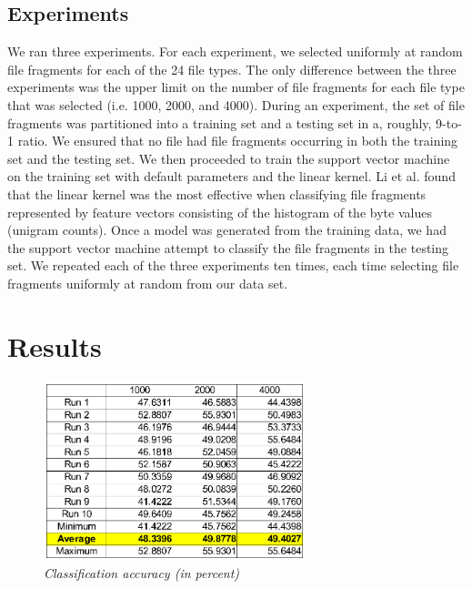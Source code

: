 \documentclass[5p]{elsarticle}
\begin{document}
\subsection{Experiments}
\label{Subsection:Experiments}
We ran three experiments. For each experiment, we selected uniformly at random file fragments for each of the 24 file types. The only difference between the three experiments was the upper limit on the number of file fragments for each file type that was selected (i.e. 1000, 2000, and 4000). During an experiment, the set of file fragments was partitioned into a training set and a testing set in a, roughly, 9-to-1 ratio. We ensured that no file had file fragments occurring in both the training set and the testing set. We then proceeded to train the support vector machine on the training set with default parameters and the linear kernel. Li et al. \cite{Li10} found that the linear kernel was the most effective when classifying file fragments represented by feature vectors consisting of the histogram of the byte values (unigram counts). Once a model was generated from the training data, we had the support vector machine attempt to classify the file fragments in the testing set. We repeated each of the three experiments ten times, each time selecting file fragments uniformly at random from our data set.

\section{Results}
\label{Section:Results}
\begin{figure}[t]
\centering
\includegraphics[width=3in]{results.ps}
\caption{\textit{Classification accuracy (in percent)}\label{fig:PredictionAccuracy}}
\end{figure}
\end{document}
